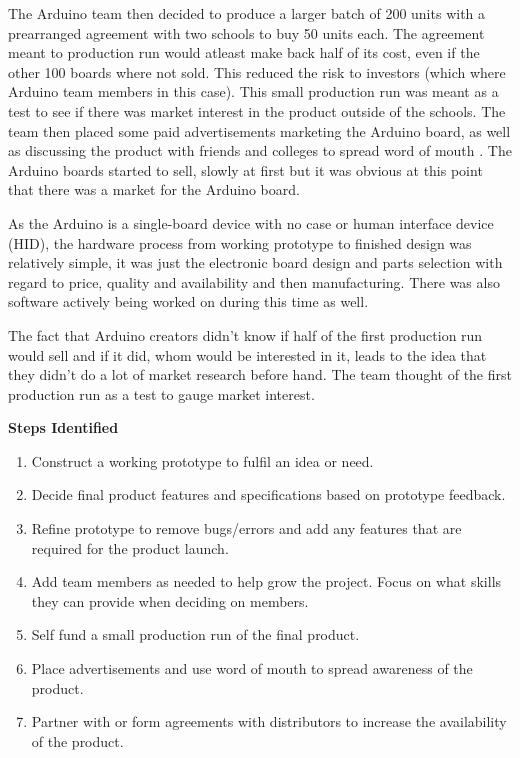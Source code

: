 The Arduino team then decided to produce a larger batch of 200 units with a prearranged agreement with two schools to buy 50 units each. The agreement meant to production run would atleast make back half of its cost, even if the other 100 boards where not sold. This reduced the risk to investors (which where Arduino team members in this case). This small production run was meant as a test to see if there was market interest in the product outside of the schools. The team then placed some paid advertisements marketing the Arduino board, as well as discussing the product with friends and colleges to spread word of mouth \cite{RN111}. The Arduino boards started to sell, slowly at first but it was obvious at this point that there was a market for the Arduino board.

As the Arduino is a single-board device with no case or human interface device (HID), the  hardware process from working prototype to finished design was relatively simple, it was just the electronic board design and parts selection with regard to price, quality and availability and then manufacturing. There was also software actively being worked on during this time as well.

The fact that Arduino creators didn't know if half of the first production run would sell and if it did, whom would be interested in it, leads to the idea that they didn't do a lot of market research before hand. The team thought of the first production run as a test to gauge market interest.


\textbf{Steps Identified}\\
\begin{enumerate}
\item Construct a working prototype to fulfil an idea or need.
\item Decide final product features and specifications based on prototype feedback.
\item Refine prototype to remove bugs/errors and add any features that are required for the product launch.
\item Add team members as needed to help grow the project. Focus on what skills they can provide when deciding on members.
\item Self fund a small production run of the final product.
\item Place advertisements and use word of mouth to spread awareness of the product.
\item Partner with or form agreements with distributors to increase the availability of the product.
\end{enumerate} 


